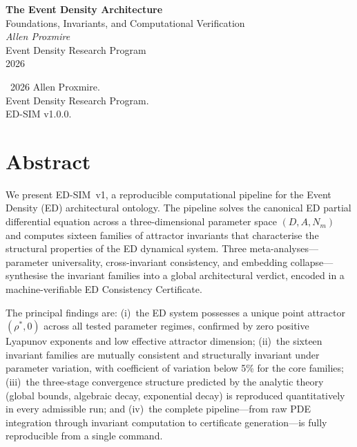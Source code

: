 \documentclass[11pt,twoside,openright]{book}
\theoremstyle{definition}
\theoremstyle{plain}
\theoremstyle{definition}
\theoremstyle{remark}
\newcommand{\rhostar}{\rho^{*}}
\begin{document}
\frontmatter

\begin{titlepage}
\centering
\vspace*{2cm}
{\Huge\bfseries The Event Density Architecture}\\[0.8cm]
{\Large Foundations, Invariants, and Computational Verification}\\[2.5cm]
{\large\itshape Allen Proxmire}\\[0.5cm]
{\normalsize Event Density Research Program}\\[4cm]
{\normalsize 2026}
\vfill
\end{titlepage}

\thispagestyle{empty}
\vspace*{\fill}
\noindent\textcopyright\ 2026 Allen Proxmire.\\
Event Density Research Program.\\[1em]
\noindent ED-SIM v1.0.0.
\vspace*{\fill}
\clearpage

\chapter*{Abstract}

We present ED-SIM~v1, a reproducible computational pipeline for the Event Density (ED) architectural ontology. The pipeline solves the canonical ED partial differential equation across a three-dimensional parameter space \((D, A, N_m)\) and computes sixteen families of attractor invariants that characterise the structural properties of the ED dynamical system. Three meta-analyses---parameter universality, cross-invariant consistency, and embedding collapse---synthesise the invariant families into a global architectural verdict, encoded in a machine-verifiable ED Consistency Certificate.

The principal findings are: (i)~the ED system possesses a unique point attractor \((\rhostar, 0)\) across all tested parameter regimes, confirmed by zero positive Lyapunov exponents and low effective attractor dimension; (ii)~the sixteen invariant families are mutually consistent and structurally invariant under parameter variation, with coefficient of variation below 5\% for the core families; (iii)~the three-stage convergence structure predicted by the analytic theory (global bounds, algebraic decay, exponential decay) is reproduced quantitatively in every admissible run; and (iv)~the complete pipeline---from raw PDE integration through invariant computation to certificate generation---is fully reproducible from a single command.
\end{document}
